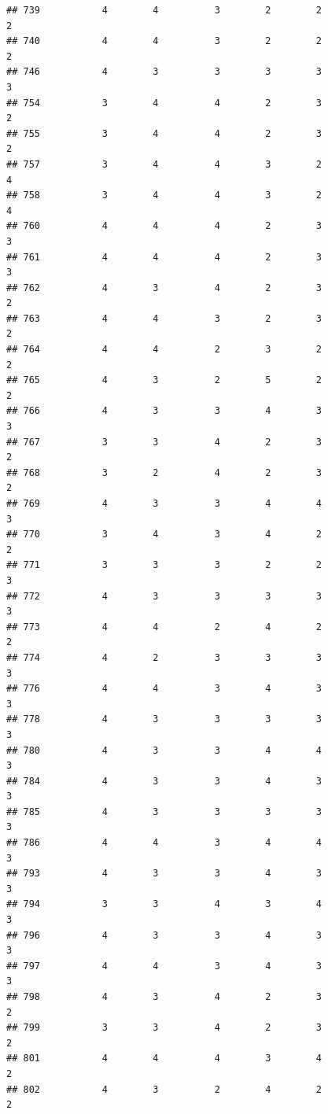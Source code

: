 \documentclass[
]{article}
\begin{document}
\begin{verbatim}
## 739           4        4          3        2        2               2
## 740           4        4          3        2        2               2
## 746           4        3          3        3        3               3
## 754           3        4          4        2        3               2
## 755           3        4          4        2        3               2
## 757           3        4          4        3        2               4
## 758           3        4          4        3        2               4
## 760           4        4          4        2        3               3
## 761           4        4          4        2        3               3
## 762           4        3          4        2        3               2
## 763           4        4          3        2        3               2
## 764           4        4          2        3        2               2
## 765           4        3          2        5        2               2
## 766           4        3          3        4        3               3
## 767           3        3          4        2        3               2
## 768           3        2          4        2        3               2
## 769           4        3          3        4        4               3
## 770           3        4          3        4        2               2
## 771           3        3          3        2        2               3
## 772           4        3          3        3        3               3
## 773           4        4          2        4        2               2
## 774           4        2          3        3        3               3
## 776           4        4          3        4        3               3
## 778           4        3          3        3        3               3
## 780           4        3          3        4        4               3
## 784           4        3          3        4        3               3
## 785           4        3          3        3        3               3
## 786           4        4          3        4        4               3
## 793           4        3          3        4        3               3
## 794           3        3          4        3        4               3
## 796           4        3          3        4        3               3
## 797           4        4          3        4        3               3
## 798           4        3          4        2        3               2
## 799           3        3          4        2        3               2
## 801           4        4          4        3        4               2
## 802           4        3          2        4        2               2

\end{verbatim}
\end{document}
